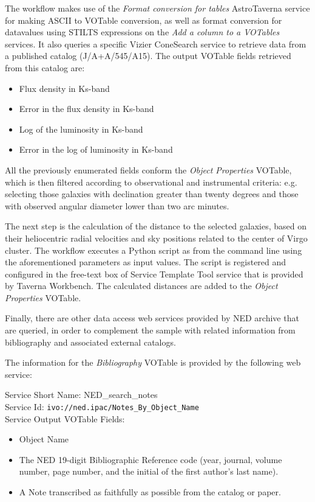 \documentclass{aa}
\begin{document}
The workflow makes use of the \textit{Format conversion for tables} AstroTaverna service for making ASCII to VOTable conversion, as well as format conversion for datavalues using STILTS expressions on the \textit{Add a column to a VOTables} services. It also queries a specific Vizier ConeSearch service to retrieve data from a published catalog (J/A+A/545/A15). The output VOTable fields retrieved from this catalog are:

\begin{itemize}
\item Flux density in Ks-band 
\item Error in the flux density in Ks-band
\item Log of the luminosity in Ks-band
\item Error in the log of luminosity in Ks-band
\end{itemize}

All the previously enumerated fields conform the \textit{Object Properties} VOTable, which is then filtered according to observational and instrumental criteria: e.g. selecting those galaxies with declination greater than twenty degrees and those with observed angular diameter lower than two arc minutes. 

The next step is the calculation of the distance to the selected galaxies, based on their heliocentric radial velocities and sky positions related to the center of Virgo cluster. The workflow executes a Python script as from the command line using the aforementioned parameters as input values. The script is registered and configured in the free-text box of Service Template Tool service that is provided by Taverna Workbench. The calculated distances are added to the \textit{Object Properties} VOTable. 

Finally, there are other data access web services provided by NED archive that are queried, in order to complement the sample with related information from bibliography and associated external catalogs. 

The information for the \textit{Bibliography} VOTable is provided by the following web service:

\begin{minipage}[h]{0.9\columnwidth}
  \small \vspace{\baselineskip}
\noindent Service Short Name: NED\_search\_notes\\
Service Id: \texttt{ivo://ned.ipac/Notes\_By\_Object\_Name}\\
Service Output VOTable Fields:
\begin{itemize}
\item Object Name
\item The NED 19-digit Bibliographic Reference code (year, journal, volume number, page number, and the initial of the first author's last name).
\item A Note transcribed as faithfully as possible from the catalog or paper.
\end{itemize}
\vspace{\baselineskip}
\end{minipage}
\end{document}
